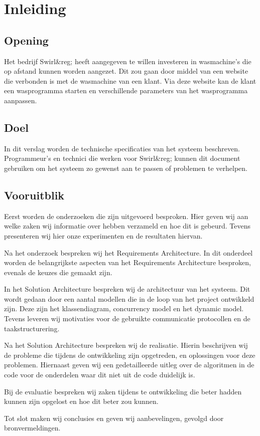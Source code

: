 \chapter{Inleiding}
\newpage

\section{Opening}
Het bedrijf Swirl&reg; heeft aangegeven te willen investeren in wasmachine's die op afstand kunnen worden aangezet.
Dit zou gaan door middel van een website die verbonden is met de wasmachine van een klant. Via deze website kan de klant een wasprogramma starten en verschillende parameters van het wasprogramma aanpassen.

\section{Doel}
In dit verslag worden de technische specificaties van het systeem beschreven.
Programmeur's en technici die werken voor Swirl&reg; kunnen dit document gebruiken om het systeem zo gewenst aan te passen of problemen te verhelpen.

\section{Vooruitblik}
Eerst worden de onderzoeken die zijn uitgevoerd besproken.
Hier geven wij aan welke zaken wij informatie over hebben verzameld en hoe dit is gebeurd. Tevens presenteren wij hier onze experimenten en de resultaten hiervan.

Na het onderzoek bespreken wij het Requirements Architecture. In dit onderdeel worden de belangrijkste aspecten van het Requirements Architecture besproken, evenals de keuzes die gemaakt zijn.

In het Solution Architecture bespreken wij de architectuur van het systeem. Dit wordt gedaan door een aantal modellen die in de loop van het project ontwikkeld zijn. Deze zijn het klassendiagram, concurrency model en het dynamic model.
Tevens leveren wij motivaties voor de gebruikte communicatie protocollen en de taakstructurering.

Na het Solution Architecture bespreken wij de realisatie. Hierin beschrijven wij de probleme die tijdens de ontwikkeling zijn opgetreden, en oplossingen voor deze problemen.
Hiernaast geven wij een gedetailleerde uitleg over de algoritmen in de code voor de onderdelen waar dit niet uit de code duidelijk is.

Bij de evaluatie bespreken wij zaken tijdens te ontwikkeling die beter hadden kunnen zijn opgelost en hoe dit beter zou kunnen.

Tot slot maken wij conclusies en geven wij aanbevelingen, gevolgd door bronvermeldingen.